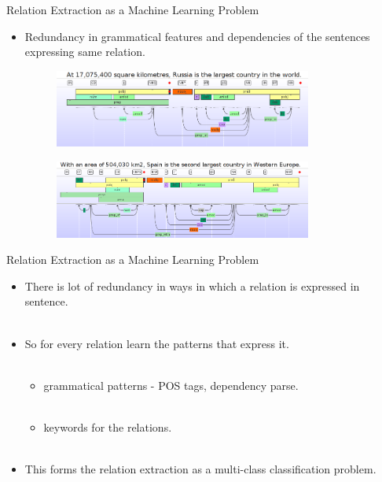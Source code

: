 \documentclass{beamer}
\begin{document}
\begin{frame}{Relation Extraction as a Machine Learning Problem}
 
 \begin{itemize}
  \item Redundancy in grammatical features and dependencies of the sentences expressing same relation. \pause 
     \begin{figure}
    \centering
    \includegraphics[width = 0.8\textwidth]{images/ex_4}
  \end{figure} \pause
  
   \begin{figure}
    \centering
    \includegraphics[width = 0.8\textwidth]{images/ex_5}
  \end{figure}
 \end{itemize}

\end{frame}
\begin{frame}{Relation Extraction as a Machine Learning Problem}
\begin{itemize}
  \item There is lot of redundancy in ways in which a relation is expressed in sentence. \pause \\~\\
  \item So for every relation learn the patterns that express it. \pause \\~\\
    \begin{itemize}
      \item grammatical patterns - POS tags, dependency parse. \pause \\~\\
      \item keywords for the relations. \pause \\~\\
    \end{itemize}
    
    \item This forms the relation extraction as a multi-class classification problem.
 \end{itemize}
\end{frame}
\end{document}
